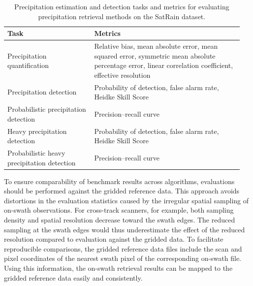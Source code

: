 \documentclass[11pt]{article}
\begin{document}
\begin{table}[htbp]
	\centering
	\caption{Precipitation estimation and detection tasks and metrics for evaluating
		precipitation retrieval methods on the SatRain dataset.}
	\begin{tabular}{>{\raggedright\arraybackslash}p{0.35\linewidth}
		>{\raggedright\arraybackslash}p{0.6\linewidth}} \toprule
		\textbf{Task}                               & \textbf{Metrics}                                   \\ \midrule Precipitation quantification &
		Relative bias, mean absolute error, mean squared error, symmetric mean
		absolute percentage error, linear correlation coefficient, effective
		resolution                                                                                       \\
		\addlinespace
		Precipitation detection                     & Probability of detection, false alarm rate, Heidke
		Skill Score                                                                                      \\
		\addlinespace
		Probabilistic precipitation detection       & Precision--recall curve                            \\
		\addlinespace
		Heavy precipitation detection               & Probability of detection, false alarm rate,
		Heidke Skill Score                                                                               \\
		\addlinespace
		Probabilistic heavy precipitation detection & Precision--recall curve
		\\ \bottomrule
	\end{tabular}
\end{table}

To ensure comparability of benchmark results across algorithms, evaluations
should be performed against the gridded reference data. This approach avoids
distortions in the evaluation statistics caused by the irregular spatial
sampling of on-swath observations. For cross-track scanners, for example, both
sampling density and spatial resolution decrease toward the swath edges. The
reduced sampling at the swath edges would thus underestimate the effect of the
reduced resolution compared to evaluation against the gridded data. To
facilitate reproducible comparisons, the gridded reference data files include the scan
and pixel coordinates of the nearest swath pixel of the corresponding on-swath file.
Using this information, the on-swath retrieval results can be mapped to the gridded
reference data easily and consistently.
\end{document}
